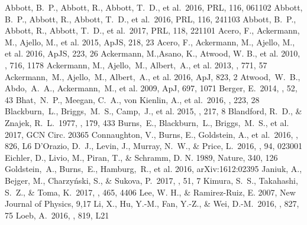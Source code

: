 \documentclass{aastex61}
\begin{document}
%
%
\begin{thebibliography}{}
 Abbott, B.~P., Abbott, R., Abbott, T.~D., et al.\ 2016, PRL, 116, 061102 
 Abbott, B.~P., Abbott, R., Abbott, T.~D., et al.\ 2016, PRL, 116, 241103 
 Abbott, B.~P., Abbott, R., Abbott, T.~D., et al.\ 2017, PRL, 118, 221101
 Acero,  F.,  Ackermann,  M.,  Ajello,  M.,  et  al. 2015, ApJS, 218, 23
 Acero, F., Ackermann,  M.,  Ajello,  M., et al. 2016, ApJS, 223, 26
 Ackermann, M.,Asano, K., Atwood, W. B., et al. 2010, \apj, 716, 1178
 Ackermann, M., Ajello,~M., Albert,~A., et al. 2013, \apj, 771, 57 
 Ackermann,~M., Ajello,~M., Albert,~A., et al. 2016, ApJ, 823, 2
 Atwood,~W.~B., Abdo,~A.~A., Ackermann,~M., et al. 2009, ApJ, 697, 1071
 Berger, E.\ 2014, \araa, 52, 43 
 Bhat,~N.~P., Meegan, C.~A., von Kienlin, A., et al.\ 2016, \apjs, 223, 28 
 Blackburn,~L., Briggs,~M.~S., Camp,~J., et al. 2015, \apjs, 217, 8
 Blandford, R.~D., \& Znajek, R.~L.\ 1977, \mnras, 179, 433 
 Burns,~E., Blackburn,~L., Briggs,~M.~S., et al. 2017, GCN Circ. 20365
 Connaughton, V., Burns, E., Goldstein, A., et al.\ 2016, \apjl, 826, L6 
 D'Orazio, D.~J., Levin, J., Murray, N.~W., \& Price, L.\ 2016, \prd, 94, 023001 
 Eichler, D., Livio, M., Piran, T., \& Schramm, D. N. 1989, Nature, 340, 126
 Goldstein,~A., Burns,~E., Hamburg,~R., et al. 2016, arXiv:1612:02395
 Janiuk, A., Bejger, M., Charzy{\'n}ski, S., \& Sukova, P.\ 2017, \na, 51, 7 
 Kimura, S.~S., Takahashi, S.~Z., \& Toma, K.\ 2017, \mnras, 465, 4406 
 Lee, W. H., \& Ramirez-Ruiz, E. 2007, New Journal of Physics, 9,17
 Li, X., Hu, Y.-M., Fan, Y.-Z., \& Wei, D.-M.\ 2016, \apj, 827, 75 
 Loeb, A.\ 2016, \apjl, 819, L21 

\end{thebibliography}
\end{document}
